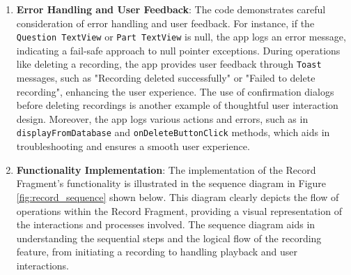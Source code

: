 \documentclass[conference,10pt,letterpaper]{IEEEtran}
\begin{document}
\begin{enumerate}
		\item \textbf{Error Handling and User Feedback}: 
		The code demonstrates careful consideration of error handling and user feedback. For instance, if the \texttt{Question TextView} or \texttt{Part TextView} is null, the app logs an error message, indicating a fail-safe approach to null pointer exceptions. During operations like deleting a recording, the app provides user feedback through \texttt{Toast} messages, such as "Recording deleted successfully" or "Failed to delete recording", enhancing the user experience. The use of confirmation dialogs before deleting recordings is another example of thoughtful user interaction design. Moreover, the app logs various actions and errors, such as in \texttt{displayFromDatabase} and \texttt{onDeleteButtonClick} methods, which aids in troubleshooting and ensures a smooth user experience.
		
		\item \textbf{Functionality Implementation}: 
		The implementation of the Record Fragment's functionality is illustrated in the sequence diagram in Figure \ref{fig:record_sequence} shown below. This diagram clearly depicts the flow of operations within the Record Fragment, providing a visual representation of the interactions and processes involved. The sequence diagram aids in understanding the sequential steps and the logical flow of the recording feature, from initiating a recording to handling playback and user interactions.
		

\end{enumerate}
\end{document}
